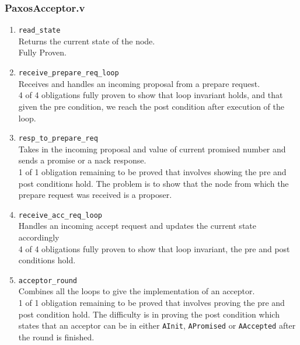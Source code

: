 \vspace{-5mm}
\subsubsection{PaxosAcceptor.v}
\begin{enumerate}
  \item \texttt{read\_state} \\
    Returns the current state of the node. \\
    Fully Proven.
  \item \texttt{receive\_prepare\_req\_loop} \\
    Receives and handles an incoming proposal from
    a prepare request. \\
    4 of 4 obligations fully proven to show that loop invariant holds, and that
    given the pre condition, we reach the post condition after execution of the loop.
  \item \texttt{resp\_to\_prepare\_req} \\
    Takes in the incoming proposal and value of current promised number
    and sends a promise or a nack response. \\
    1 of 1 obligation remaining to be proved that involves showing the pre and post
    conditions hold. The problem is to show that
    the node from which the prepare request was received is a proposer.
  \item \texttt{receive\_acc\_req\_loop} \\
    Handles an incoming accept request and updates the current state accordingly \\
    4 of 4 obligations fully proven to show that loop invariant, the pre and post
    conditions hold.
  \item \texttt{acceptor\_round} \\
    Combines all the loops to give the implementation of an acceptor. \\
    1 of 1 obligation remaining to be proved that involves proving the pre and post
    condition hold. The difficulty is in proving
    the post condition which states that an acceptor can be in either \texttt{AInit},
    \texttt{APromised} or \texttt{AAccepted} after the round is finished.
\end{enumerate}

\vspace{-5mm}
